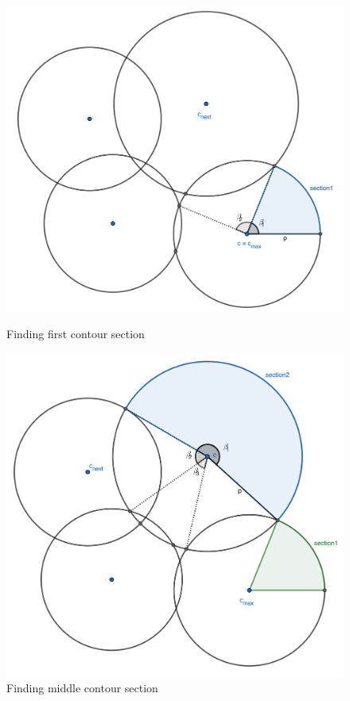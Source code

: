 \begin{figure}[!htb]
    \includegraphics[width=1.0\textwidth]{figures/contour/c1copy.pdf}
    \caption{Finding first contour section}
  \endminipage\hfill
    \includegraphics[width=1.0\textwidth]{figures/contour/c2copy.pdf}
    \caption{Finding middle contour section}

\end{figure}
